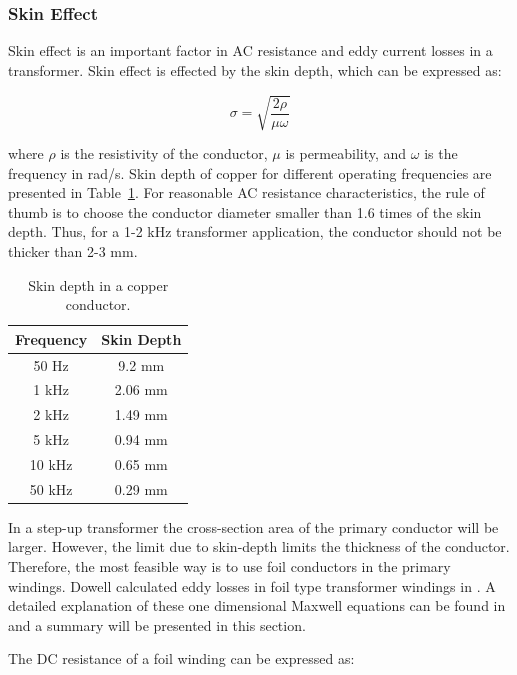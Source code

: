 \documentclass[a4paper, 11pt]{article} %
\begin{document}
\subsubsection{Skin Effect}

Skin effect is an important factor in AC resistance and eddy current losses in a transformer. Skin effect is effected by the skin depth, which can be expressed as:

\begin{equation}
  \sigma = \sqrt{\frac{2\rho}{\mu \omega}}
\end{equation}

where $\rho$ is the resistivity of the conductor, $\mu$ is permeability, and $\omega$ is the frequency in rad/s. Skin depth of copper for different operating frequencies are presented in Table~\ref{skin-depth}. For reasonable AC resistance characteristics, the rule of thumb is to choose the conductor diameter smaller than 1.6 times of the skin depth. Thus, for a 1-2 kHz transformer application, the conductor should not be thicker than 2-3 mm. 

\begin{table}[]
\begin{center}
\begin{tabular}{cc}
Frequency & Skin Depth \\
\hline
50 Hz & 9.2 mm \\
1 kHz & 2.06 mm \\
2 kHz & 1.49 mm \\
5 kHz & 0.94 mm \\
10 kHz & 0.65 mm \\
50 kHz & 0.29 mm \\
\hline
\end{tabular} 
\end{center}
\caption{Skin depth in a copper conductor.}
\label{skin-depth}
\end{table}

In a step-up transformer the cross-section area of the primary conductor will be larger. However, the limit due to skin-depth limits the thickness of the conductor. Therefore, the most feasible way is to use foil conductors in the primary windings. 
Dowell calculated eddy losses in foil type transformer windings in \cite{Dowell1966}. A detailed explanation of these one dimensional Maxwell equations can be found in \cite{Villar2010} and a summary will be presented in this section.

The DC resistance of a foil winding can be expressed as:
\end{document}
